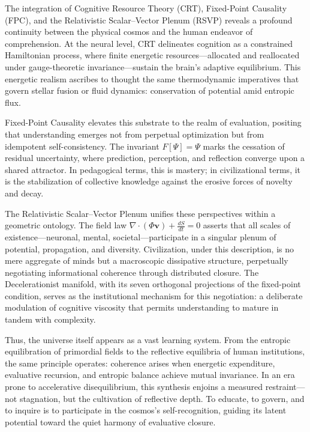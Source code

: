 \documentclass[12pt,a4paper]{article}
\begin{document}
The integration of Cognitive Resource Theory (CRT), Fixed-Point Causality (FPC), and the Relativistic Scalar–Vector Plenum (RSVP) reveals a profound continuity between the physical cosmos and the human endeavor of comprehension.  At the neural level, CRT delineates cognition as a constrained Hamiltonian process, where finite energetic resources—allocated and reallocated under gauge-theoretic invariance—sustain the brain’s adaptive equilibrium.  This energetic realism ascribes to thought the same thermodynamic imperatives that govern stellar fusion or fluid dynamics: conservation of potential amid entropic flux.

Fixed-Point Causality elevates this substrate to the realm of evaluation, positing that understanding emerges not from perpetual optimization but from idempotent self-consistency.  The invariant \(F[\Psi]=\Psi\) marks the cessation of residual uncertainty, where prediction, perception, and reflection converge upon a shared attractor.  In pedagogical terms, this is mastery; in civilizational terms, it is the stabilization of collective knowledge against the erosive forces of novelty and decay.

The Relativistic Scalar–Vector Plenum unifies these perspectives within a geometric ontology.  The field law \(\nabla\!\cdot(\Phi\mathbf{v})+\frac{dS}{dt}=0\) asserts that all scales of existence—neuronal, mental, societal—participate in a singular plenum of potential, propagation, and diversity.  Civilization, under this description, is no mere aggregate of minds but a macroscopic dissipative structure, perpetually negotiating informational coherence through distributed closure.  The Decelerationist manifold, with its seven orthogonal projections of the fixed-point condition, serves as the institutional mechanism for this negotiation: a deliberate modulation of cognitive viscosity that permits understanding to mature in tandem with complexity.

Thus, the universe itself appears as a vast learning system.  From the entropic equilibration of primordial fields to the reflective equilibria of human institutions, the same principle operates: coherence arises when energetic expenditure, evaluative recursion, and entropic balance achieve mutual invariance.  In an era prone to accelerative disequilibrium, this synthesis enjoins a measured restraint—not stagnation, but the cultivation of reflective depth.  To educate, to govern, and to inquire is to participate in the cosmos’s self-recognition, guiding its latent potential toward the quiet harmony of evaluative closure.
\end{document}
